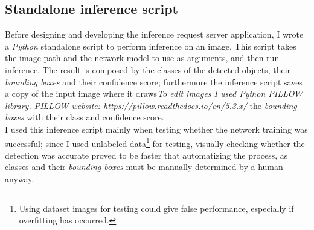 \subsection{Standalone inference script}
Before designing and developing the inference request server application, I wrote a \emph{Python} standalone script to perform inference on an image. This script takes the image path and the network model to use as arguments, and then run inference. The result is composed by the classes of the detected objects, their \emph{bounding boxes} and their confidence score; furthermore the inference script saves a copy of the input image where it draws\emph{To edit images I used Python PILLOW library. PILLOW website: \url{https://pillow.readthedocs.io/en/5.3.x/}} the \emph{bounding boxes} with their class and confidence score. \\
I used this inference script mainly when testing whether the network training was successful; since I used unlabeled data\footnote{Using dataset images for testing could give false performance, especially if overfitting has occurred.} for testing, visually checking whether the detection was accurate proved to be faster that automatizing the process, as classes and their \emph{bounding boxes} must be manually determined by a human anyway.

